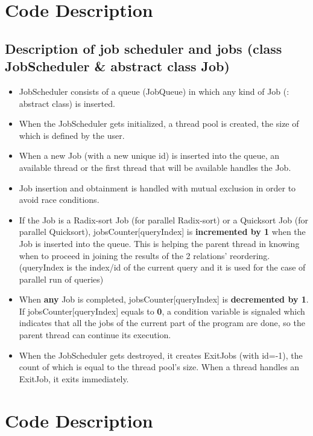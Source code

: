 \documentclass{ws-ijprai}
\begin{document}
\clearpage
\section{Code Description}
\subsection{Description of job scheduler and jobs (class JobScheduler & abstract class Job)}
\begin{itemize}
    \item JobScheduler consists of a queue (JobQueue) in which any kind of Job (: abstract class) is inserted.
    \item When the JobScheduler gets initialized, a thread pool is created, the size of which is defined by the user.
    \item When a new Job (with a new unique id) is inserted into the queue, an available thread or the first thread that will be available handles the Job.
    \item Job insertion and obtainment is handled with mutual exclusion in order to avoid race conditions.
    \item If the Job is a Radix-sort Job (for parallel Radix-sort) or a Quicksort Job (for parallel Quicksort), jobsCounter[queryIndex] is \textbf{incremented by 1} when the Job is inserted into the queue. This is helping the parent thread in knowing when to proceed in joining the results of the 2 relations’ reordering. (queryIndex is the index/id of the current query and it is used for the case of parallel run of queries)
    \item When \textbf{any} Job is completed, jobsCounter[queryIndex] is \textbf{decremented by 1}. If jobsCounter[queryIndex] equals to \textbf{0}, a condition variable is signaled which indicates that all the jobs of the current part of the program are done, so the parent thread can continue its execution.
    \item When the JobScheduler gets destroyed, it creates ExitJobs (with id=-1), the count of which is equal to the thread pool’s size. When a thread handles an ExitJob, it exits immediately.
\end{itemize}
\section{Code Description}
\end{document}
